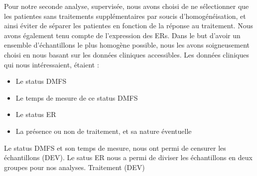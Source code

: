 			\pagebreak

			Pour notre seconde analyse, supervisée, nous avons choisi de ne sélectionner que les patientes sans traitements supplémentaires par soucis d'homogénéisation, et ainsi éviter de séparer les patientes en fonction de la réponse au traitement.
			Nous avons également tenu compte de l'expression des \aclp{ER}.
			Dans le but d'avoir un ensemble d'échantillons le plus homogène possible, nous les avons soigneusement choisi en nous basant sur les données cliniques accessibles.
			Les données cliniques qui nous intéressaient, étaient :
			\begin{itemize}
				\item Le status \acs{DMFS}
				\item Le temps de mesure de ce status \acs{DMFS}
				\item Le status \acs{ER}
				\item La présence ou non de traitement, et sa nature éventuelle
			\end{itemize}

			Le status \acs{DMFS} et son temps de mesure, nous ont permi de censurer les échantillons (DEV).
			Le satus \acs{ER} nous a permi de diviser les échantillons en deux groupes pour nos analyses.
			Traitement (DEV)

